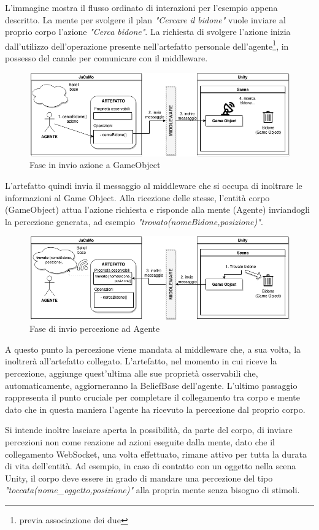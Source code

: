 L'immagine mostra il flusso ordinato di interazioni per l'esempio appena descritto. La mente per svolgere il plan \textit{"Cercare il bidone"} vuole inviare al proprio corpo l'azione \textit{"Cerca bidone"}. La richiesta di svolgere l'azione inizia dall'utilizzo dell'operazione presente nell'artefatto personale dell'agente\footnote{previa associazione dei due}, in possesso del canale per comunicare con il middleware.

\begin{figure}[H]
\centering
\includegraphics[width=\textwidth]{figures/da_Agente_a_Game_Object.png}
\caption{Fase in invio azione a GameObject}
\end{figure}

L'artefatto quindi invia il messaggio al middleware che si occupa di inoltrare le informazioni al Game Object. Alla ricezione delle stesse, l'entità corpo (GameObject) attua l'azione richiesta e risponde alla mente (Agente) inviandogli la percezione generata, ad esempio \textit{"trovato(nomeBidone,posizione)"}.

\begin{figure}[H]
\centering
\includegraphics[width=\textwidth]{figures/da_Game_Object_a_Agente.png}
\caption{Fase di invio percezione ad Agente}
\end{figure}

A questo punto la percezione viene mandata al middleware che, a sua volta, la inoltrerà all'artefatto collegato. L'artefatto, nel momento in cui riceve la percezione, aggiunge quest'ultima alle sue proprietà osservabili che, automaticamente, aggiorneranno la BeliefBase dell'agente. L'ultimo passaggio rappresenta il punto cruciale per completare il collegamento tra corpo e mente dato che in questa maniera l'agente ha ricevuto la percezione dal proprio corpo. 

\medskip

Si intende inoltre lasciare aperta la possibilità, da parte del corpo, di inviare percezioni non come reazione ad azioni eseguite dalla mente, dato che il collegamento WebSocket, una volta effettuato, rimane attivo per tutta la durata di vita dell'entità. Ad esempio, in caso di contatto con un oggetto nella scena Unity, il corpo deve essere in grado di mandare una percezione del tipo \textit{"toccata(nome\_oggetto,posizione)"} alla propria mente senza bisogno di stimoli.
